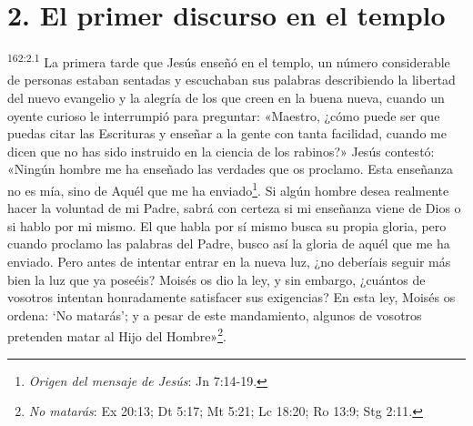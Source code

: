 \section*{2. El primer discurso en el templo}
\par
\textsuperscript{162:2.1} La primera tarde que Jesús enseñó en el templo, un número considerable de personas estaban sentadas y escuchaban sus palabras describiendo la libertad del nuevo evangelio y la alegría de los que creen en la buena nueva, cuando un oyente curioso le interrumpió para preguntar: «Maestro, ¿cómo puede ser que puedas citar las Escrituras y enseñar a la gente con tanta facilidad, cuando me dicen que no has sido instruido en la ciencia de los rabinos?» Jesús contestó: «Ningún hombre me ha enseñado las verdades que os proclamo. Esta enseñanza no es mía, sino de Aquél que me ha enviado\footnote{\textit{Origen del mensaje de Jesús}: Jn 7:14-19.}. Si algún hombre desea realmente hacer la voluntad de mi Padre, sabrá con certeza si mi enseñanza viene de Dios o si hablo por mi mismo. El que habla por sí mismo busca su propia gloria, pero cuando proclamo las palabras del Padre, busco así la gloria de aquél que me ha enviado. Pero antes de intentar entrar en la nueva luz, ¿no deberíais seguir más bien la luz que ya poseéis? Moisés os dio la ley, y sin embargo, ¿cuántos de vosotros intentan honradamente satisfacer sus exigencias? En esta ley, Moisés os ordena: `No matarás'; y a pesar de este mandamiento, algunos de vosotros pretenden matar al Hijo del Hombre»\footnote{\textit{No matarás}: Ex 20:13; Dt 5:17; Mt 5:21; Lc 18:20; Ro 13:9; Stg 2:11.}.

